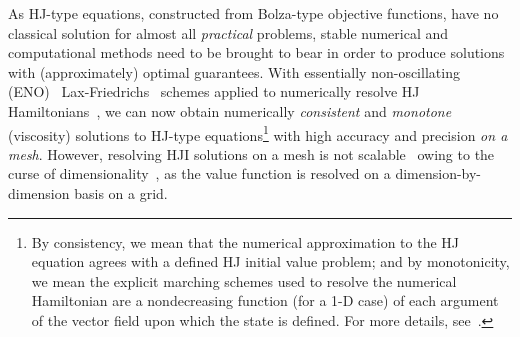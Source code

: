 As HJ-type equations, constructed from Bolza-type objective functions, have no classical solution for almost all \textit{practical} problems, stable numerical and computational methods need to be brought to bear in order to produce solutions with (approximately) optimal guarantees. With essentially non-oscillating (ENO)~\cite{OsherShuENO} Lax-Friedrichs~\cite{CrandallLaxFriedrichs} schemes applied to numerically resolve HJ Hamiltonians~\cite{Evans1984}, we can now obtain  numerically \textit{consistent} and \textit{monotone} (viscosity) solutions to HJ-type equations\footnote{By consistency, we mean that the numerical approximation to the HJ equation agrees with a defined HJ initial value problem; and by monotonicity, we mean the explicit marching schemes used to resolve the numerical Hamiltonian are a nondecreasing function (for a 1-D case) of each argument of the vector field upon which the state is defined. For more details, see~\cite{Crandall1984Approx, OsherShuENO}.} with high accuracy and precision \textit{on a mesh}. However, resolving HJI solutions on a mesh is not scalable~\cite{SylviaScalability, Bansal2018, Bajcsy} owing to the curse of dimensionality~\cite{Bellman1957}, as the value function is resolved on a dimension-by-dimension basis on a grid. 


